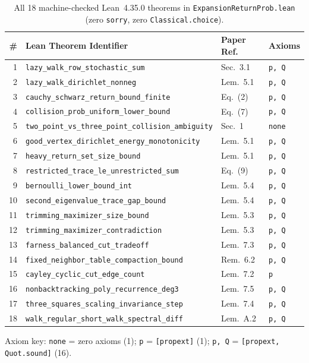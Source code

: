 \documentclass[10pt,twocolumn]{article}
\begin{document}
\begin{table}[t]
\centering
\caption{All 18 machine-checked Lean~4.35.0 theorems in \texttt{ExpansionReturnProb.lean} (zero \texttt{sorry}, zero \texttt{Classical.choice}).}
\label{tab:lean}
\scriptsize
\setlength{\tabcolsep}{1.5pt}
\begin{tabular}{@{}rlll@{}}
\toprule
\# & Lean Theorem Identifier & Paper Ref. & Axioms \\
\midrule
1 & \texttt{lazy\_walk\_row\_stochastic\_sum} & Sec.~3.1 & \texttt{p, Q} \\
2 & \texttt{lazy\_walk\_dirichlet\_nonneg} & Lem.~5.1 & \texttt{p, Q} \\
3 & \texttt{cauchy\_schwarz\_return\_bound\_finite} & Eq.~(2) & \texttt{p, Q} \\
4 & \texttt{collision\_prob\_uniform\_lower\_bound} & Eq.~(7) & \texttt{p, Q} \\
5 & \texttt{two\_point\_vs\_three\_point\_collision\_ambiguity} & Sec.~1 & \texttt{none} \\
6 & \texttt{good\_vertex\_dirichlet\_energy\_monotonicity} & Lem.~5.1 & \texttt{p, Q} \\
7 & \texttt{heavy\_return\_set\_size\_bound} & Lem.~5.1 & \texttt{p, Q} \\
8 & \texttt{restricted\_trace\_le\_unrestricted\_sum} & Eq.~(9) & \texttt{p, Q} \\
9 & \texttt{bernoulli\_lower\_bound\_int} & Lem.~5.4 & \texttt{p, Q} \\
10 & \texttt{second\_eigenvalue\_trace\_gap\_bound} & Lem.~5.4 & \texttt{p, Q} \\
11 & \texttt{trimming\_maximizer\_size\_bound} & Lem.~5.3 & \texttt{p, Q} \\
12 & \texttt{trimming\_maximizer\_contradiction} & Lem.~5.3 & \texttt{p, Q} \\
13 & \texttt{farness\_balanced\_cut\_tradeoff} & Lem.~7.3 & \texttt{p, Q} \\
14 & \texttt{fixed\_neighbor\_table\_compaction\_bound} & Rem.~6.2 & \texttt{p, Q} \\
15 & \texttt{cayley\_cyclic\_cut\_edge\_count} & Lem.~7.2 & \texttt{p} \\
16 & \texttt{nonbacktracking\_poly\_recurrence\_deg3} & Lem.~7.5 & \texttt{p, Q} \\
17 & \texttt{three\_squares\_scaling\_invariance\_step} & Lem.~7.4 & \texttt{p, Q} \\
18 & \texttt{walk\_regular\_short\_walk\_spectral\_diff} & Lem.~A.2 & \texttt{p, Q} \\
\bottomrule
\end{tabular}
\vspace{-0.4em}
\begin{flushleft}
\tiny Axiom key: \texttt{none} = zero axioms (1); \texttt{p} = \texttt{[propext]} (1); \texttt{p, Q} = \texttt{[propext, Quot.sound]} (16).
\end{flushleft}
\vspace{-0.8em}
\end{table}
\end{document}
